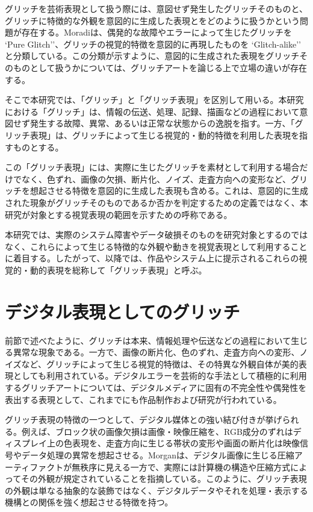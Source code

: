 グリッチを芸術表現として扱う際には、意図せず発生したグリッチそのものと、グリッチに特徴的な外観を意図的に生成した表現とをどのように扱うかという問題が存在する。Moradiは、偶発的な故障やエラーによって生じたグリッチを `Pure Glitch''、グリッチの視覚的特徴を意図的に再現したものを `Glitch-alike'' と分類している\cite{moradi2004glitch}。この分類が示すように、意図的に生成された表現をグリッチそのものとして扱うかについては、グリッチアートを論じる上で立場の違いが存在する。

そこで本研究では、「グリッチ」と「グリッチ表現」を区別して用いる。本研究における「グリッチ」は、情報の伝送、処理、記録、描画などの過程において意図せず発生する故障、異常、あるいは正常な状態からの逸脱を指す。一方、「グリッチ表現」は、グリッチによって生じる視覚的・動的特徴を利用した表現を指すものとする。

この「グリッチ表現」には、実際に生じたグリッチを素材として利用する場合だけでなく、色ずれ、画像の欠損、断片化、ノイズ、走査方向への変形など、グリッチを想起させる特徴を意図的に生成した表現も含める。これは、意図的に生成された現象がグリッチそのものであるか否かを判定するための定義ではなく、本研究が対象とする視覚表現の範囲を示すための呼称である。

本研究では、実際のシステム障害やデータ破損そのものを研究対象とするのではなく、これらによって生じる特徴的な外観や動きを視覚表現として利用することに着目する。したがって、以降では、作品やシステム上に提示されるこれらの視覚的・動的表現を総称して「グリッチ表現」と呼ぶ。



\section{デジタル表現としてのグリッチ}

前節で述べたように、グリッチは本来、情報処理や伝送などの過程において生じる異常な現象である。一方で、画像の断片化、色のずれ、走査方向への変形、ノイズなど、グリッチによって生じる視覚的特徴は、その特異な外観自体が美的表現としても利用されている。デジタルエラーを芸術的な手法として積極的に利用するグリッチアートについては、デジタルメディアに固有の不完全性や偶発性を表出する表現として、これまでにも作品制作および研究が行われている\cite{menkman2011momentum,morgan2019calculated}。

グリッチ表現の特徴の一つとして、デジタル媒体との強い結び付きが挙げられる。例えば、ブロック状の画像欠損は画像・映像圧縮を、RGB成分のずれはディスプレイ上の色表現を、走査方向に生じる帯状の変形や画面の断片化は映像信号やデータ処理の異常を想起させる。Morganは、デジタル画像に生じる圧縮アーティファクトが無秩序に見える一方で、実際には計算機の構造や圧縮方式によってその外観が規定されていることを指摘している\cite{morgan2019calculated}。このように、グリッチ表現の外観は単なる抽象的な装飾ではなく、デジタルデータやそれを処理・表示する機構との関係を強く想起させる特徴を持つ。

